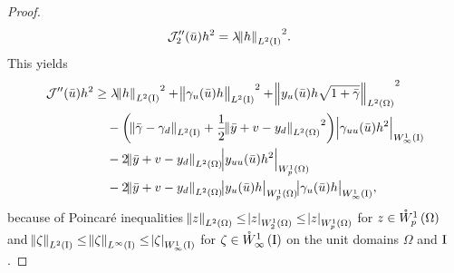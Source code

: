\documentclass[final]{siamltex}
\begin{document}
\begin{proof}
\begin{align*}
     {\mathcal{J}}_2'' ({\bar{u}}) h^2  &= \lambda {\norm{{h}}_{{L^2\del{{{\text{\rm I}}}}}}}^2 .
\end{align*}                         
This yields
\begin{align*}		
         {\mathcal{J}}''({\bar{u}})h^2  	
		&\ge \lambda {\norm{{h}}_{{L^2\del{{{\text{\rm I}}}}}}}^2 + {\norm{{\gamma_u({\bar{u}})h}}_{{L^2\del{{{\text{\rm I}}}}}}}^2 
			+  {\norm{{y_u({\bar{u}})h \sqrt{1+{\bar{\gamma}}}}}_{{L^2\del{{\Omega}}}}}^2  \\
		&\quad- \del{ {\norm{{{\bar{\gamma}} - \gamma_d}}_{{L^2\del{{{\text{\rm I}}}}}}} 
		               +\frac{1}{2} {\norm{{{\bar{y}}+v-y_d}}_{{L^2\del{{\Omega}}}}}^2 } {\abs{{\gamma_{uu}({\bar{u}})h^2}}_{{W^{{1}}_{{\infty}}\del{{\text{\rm I}}}}}}  \\
	    & \quad -2 {\norm{{{\bar{y}}+v-y_d}}_{{L^2\del{{\Omega}}}}}  {\abs{{y_{uu}({\bar{u}})h^2}}_{{W^{{1}}_{{p}}\del{{\Omega}}}}}  \\
	    & \quad -2 {\norm{{{\bar{y}}+v-y_d}}_{{L^2\del{{\Omega}}}}} {\abs{{y_u({\bar{u}})h}}_{{W^{{1}}_{{p}}\del{{\Omega}}}}} {\abs{{\gamma_u({\bar{u}})h}}_{{W^{{1}}_{{\infty}}\del{{\text{\rm I}}}}}}, 
\end{align*}
because of Poincar\'e inequalities 
${\norm{{z}}_{{L^2\del{{{\Omega}}}}}} \le {\abs{{z}}_{{W^{{{1}}}_{{{2}}}\del{{\Omega}}}}} \le {\abs{{z}}_{{W^{{{1}}}_{{{p}}}\del{{\Omega}}}}}$
for $z\in {{\mathring{W}^{1}_{p}\del{{\Omega}}}}$ and 
${\norm{{\zeta}}_{{L^2\del{{{\text{\rm I}}}}}}} \le {\norm{{\zeta}}_{{L^\infty\del{{\text{\rm I}}}}}} \le {\abs{{\zeta}}_{{W^{{{1}}}_{{{\infty}}}\del{{\text{\rm I}}}}}}$
for $\zeta\in{{\mathring{W}^{{1}}_{{\infty}}\del{{\text{\rm I}}}}}$ on the unit domains $\Omega$ and ${\text{\rm I}}$.


\end{proof}
\end{document}
